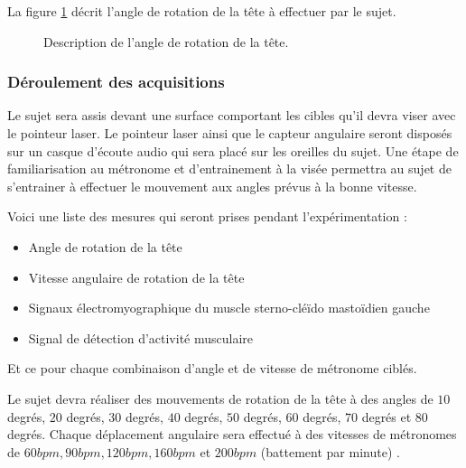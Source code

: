 \documentclass[letterpaper, twoside, 12pt, memoire, creativecommons, hyperref]{thETS}
\begin{document}
La figure \ref{fig:rotationtete} décrit l'angle de rotation de la tête à effectuer par le sujet.

\begin{figure}
	\centering
	\caption{Description de l'angle de rotation de la tête.}
	\label{fig:rotationtete}
\end{figure}

\subsubsection{Déroulement des acquisitions}

Le sujet sera assis devant une surface comportant les cibles qu’il devra viser avec le pointeur laser. Le pointeur laser ainsi que le capteur angulaire seront disposés sur un casque d’écoute audio qui sera placé sur les oreilles du sujet.
Une étape de familiarisation au métronome et d’entrainement à la visée permettra au sujet de s’entrainer à effectuer le mouvement aux angles prévus à la bonne vitesse.

Voici une liste des mesures qui seront prises pendant l’expérimentation : 

\begin{itemize}
 \item Angle de rotation de la tête 
 \item Vitesse angulaire de rotation de la tête 
 \item Signaux électromyographique du muscle sterno-cléïdo mastoïdien gauche
 \item Signal de détection d’activité musculaire
\end{itemize}

Et ce pour chaque combinaison d’angle et de vitesse de métronome ciblés.

Le sujet devra réaliser des mouvements de rotation de la tête à des angles de $10$ degrés, $20$ degrés, $30$ degrés, $40$ degrés, $50$ degrés, $60$ degrés, $70$ degrés et $80$ degrés. Chaque déplacement angulaire sera effectué à des vitesses de métronomes de $60 bpm, 90 bpm, 120 bpm, 160 bpm$ et $200 bpm$ (battement par minute) . 
\end{document}
